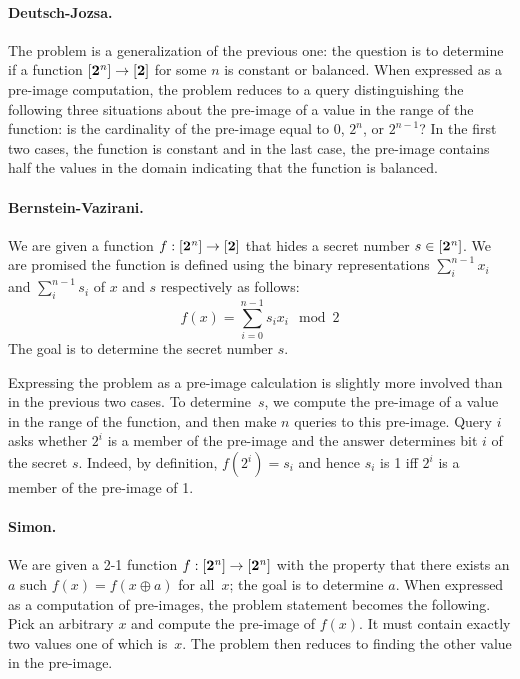 \documentclass[sigplan,screen]{acmart}
\newcommand{\finset}[1]{[\mathbf{#1}]}
\theoremstyle{definition}
\begin{document}
\paragraph*{Deutsch-Jozsa.}
The problem is a generalization of the previous one: the question is
to determine if a function $\finset{2^{\it n}} \rightarrow \finset{2}$ for
some $n$ is constant or balanced. When expressed as a pre-image
computation, the problem reduces to a query distinguishing the
following three situations about the pre-image of a value in the range
of the function: is the cardinality of the pre-image equal to 0,
$2^n$, or $2^{n-1}$? In the first two cases, the function is constant
and in the last case, the pre-image contains half the values in the
domain indicating that the function is balanced.

\paragraph*{Bernstein-Vazirani.}
We are given a function $f : \finset{2^{\it n}} \rightarrow \finset{2}$
that hides a secret number $s \in \finset{2^{\it n}}$. We are promised the
function is defined using the binary representations $\sum_i^{n-1}
x_i$ and $\sum_i^{n-1} s_i$ of $x$ and $s$ respectively as follows:
\[
f(x) = \sum_{i=0}^{n-1} s_ix_i \mod{2}
\]
The goal is to determine the secret number $s$.

Expressing the problem as a pre-image calculation is slightly more
involved than in the previous two cases. To determine~$s$, we compute
the pre-image of a value in the range of the function, and then make
$n$ queries to this pre-image. Query $i$ asks whether $2^i$ is a
member of the pre-image and the answer determines bit $i$ of the
secret $s$. Indeed, by definition, $f(2^i) = s_i$ and hence $s_i$ is 1
iff $2^i$ is a member of the pre-image of 1.

\paragraph*{Simon.}
We are given a 2-1 function $f : \finset{2^{\it n}} \rightarrow
\finset{2^{\it n}}$ with the property that there exists an $a$ such $f(x) =
f(x \oplus a)$ for all~$x$; the goal is to determine $a$. When
expressed as a computation of pre-images, the problem statement
becomes the following. Pick an arbitrary $x$ and compute the pre-image
of $f(x)$. It must contain exactly two values one of which is~$x$. The
problem then reduces to finding the other value in the pre-image.
\end{document}
